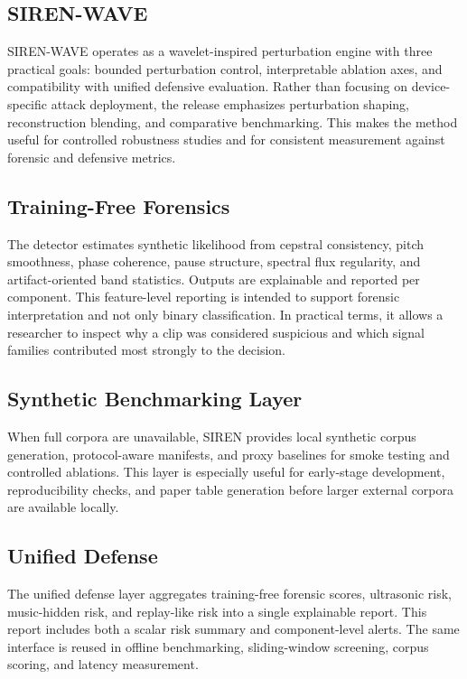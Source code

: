 \documentclass[conference]{IEEEtran}
\begin{document}
\subsection{SIREN-WAVE}
SIREN-WAVE operates as a wavelet-inspired perturbation engine with three practical goals: bounded perturbation control, interpretable ablation axes, and compatibility with unified defensive evaluation. Rather than focusing on device-specific attack deployment, the release emphasizes perturbation shaping, reconstruction blending, and comparative benchmarking. This makes the method useful for controlled robustness studies and for consistent measurement against forensic and defensive metrics.

\subsection{Training-Free Forensics}
The detector estimates synthetic likelihood from cepstral consistency, pitch smoothness, phase coherence, pause structure, spectral flux regularity, and artifact-oriented band statistics. Outputs are explainable and reported per component. This feature-level reporting is intended to support forensic interpretation and not only binary classification. In practical terms, it allows a researcher to inspect why a clip was considered suspicious and which signal families contributed most strongly to the decision.

\subsection{Synthetic Benchmarking Layer}
When full corpora are unavailable, SIREN provides local synthetic corpus generation, protocol-aware manifests, and proxy baselines for smoke testing and controlled ablations. This layer is especially useful for early-stage development, reproducibility checks, and paper table generation before larger external corpora are available locally.

\subsection{Unified Defense}
The unified defense layer aggregates training-free forensic scores, ultrasonic risk, music-hidden risk, and replay-like risk into a single explainable report. This report includes both a scalar risk summary and component-level alerts. The same interface is reused in offline benchmarking, sliding-window screening, corpus scoring, and latency measurement.
\end{document}
